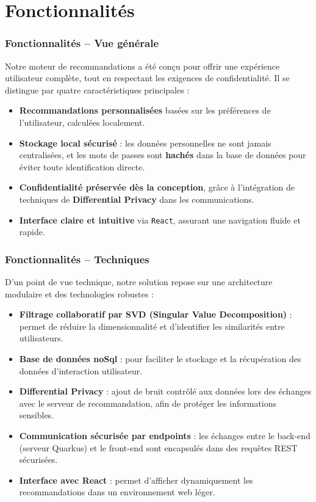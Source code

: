 \documentclass{beamer}
\begin{document}
\section{Fonctionnalités}
\begin{frame}
    \frametitle{Fonctionnalités – Vue générale}
    \small

    Notre moteur de recommandations a été conçu pour offrir une expérience utilisateur complète, tout en respectant les exigences de confidentialité. Il se distingue par quatre caractéristiques principales :

    \begin{itemize}
        \item \textbf{Recommandations personnalisées} basées sur les préférences de l’utilisateur, calculées localement.
        \item \textbf{Stockage local sécurisé} : les données personnelles ne sont jamais centralisées, et les mots de passes sont \textbf{hachés} dans la base de données pour éviter toute identification directe.
        \item \textbf{Confidentialité préservée dès la conception}, grâce à l'intégration de techniques de \textbf{Differential Privacy} dans les communications.
        \item \textbf{Interface claire et intuitive} via \texttt{React}, assurant une navigation fluide et rapide.
    \end{itemize}

\end{frame}



\begin{frame}
    \frametitle{Fonctionnalités – Techniques}
    \small
    D’un point de vue technique, notre solution repose sur une architecture modulaire et des technologies robustes :

    \begin{itemize}
        \item \textbf{Filtrage collaboratif par SVD (Singular Value Decomposition)} : permet de réduire la dimensionnalité et d’identifier les similarités entre utilisateurs.
        \item \textbf{Base de données noSql} : pour faciliter le stockage et la récupération des données d’interaction utilisateur.
        \item \textbf{Differential Privacy} : ajout de bruit contrôlé aux données lors des échanges avec le serveur de recommandation, afin de protéger les informations sensibles.
        \item \textbf{Communication sécurisée par endpoints} : les échanges entre le back-end (serveur Quarkus) et le front-end sont encapsulés dans des requêtes REST sécurisées.
        \item \textbf{Interface avec React} : permet d’afficher dynamiquement les recommandations dans un environnement web léger.
    \end{itemize}

\end{frame}
\end{document}
